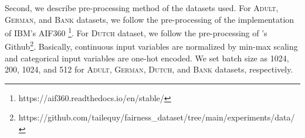 \documentclass[10pt]{article} %
\begin{document}

Second, we describe pre-processing method of the datasets used.
For \textsc{Adult}, \textsc{German}, and \textsc{Bank} datasets, we follow the pre-processing of the implementation of IBM's AIF360 \citep{aif360-oct-2018} \footnote{https://aif360.readthedocs.io/en/stable/}.
For \textsc{Dutch} dataset, we follow the pre-processing of \citet{Le_Quy_2022}'s Github\footnote{https://github.com/tailequy/fairness\_dataset/tree/main/experiments/data/}.
Basically, continuous input variables are normalized by min-max scaling and categorical input variables are one-hot encoded.
We set batch size as 1024, 200, 1024, and 512 for \textsc{Adult}, \textsc{German}, \textsc{Dutch}, and \textsc{Bank} datasets, respectively.
\end{document}
